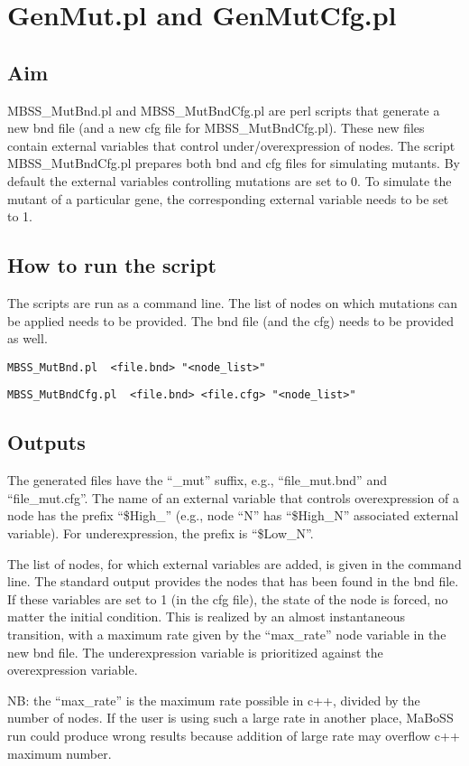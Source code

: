 \documentclass{article}
\begin{document}
\section*{GenMut.pl and GenMutCfg.pl}
\subsection*{Aim}
MBSS\_MutBnd.pl and MBSS\_MutBndCfg.pl are perl scripts that generate a new bnd file (and a new cfg file for MBSS\_MutBndCfg.pl). These new files contain external variables that control under/overexpression of nodes. The script MBSS\_MutBndCfg.pl prepares both bnd and cfg files for simulating mutants. By default the external variables controlling mutations are set to 0. To simulate the mutant of a particular gene, the corresponding external variable needs to be set to 1. 

\subsection*{How to run the script}
The scripts are run as a command line. The list of nodes on which mutations can be applied needs to be provided. The bnd file (and the cfg) needs to be provided as well.

\begin{verbatim}
MBSS_MutBnd.pl  <file.bnd> "<node_list>"
\end{verbatim}

\begin{verbatim}
MBSS_MutBndCfg.pl  <file.bnd> <file.cfg> "<node_list>"
\end{verbatim}

\subsection*{Outputs}

The generated files have the ``\_mut'' suffix, e.g., ``file\_mut.bnd'' and ``file\_mut.cfg''. The name of an external variable that controls overexpression of a node has the prefix ``\$High\_'' (e.g., node ``N'' has ``\$High\_N'' associated external variable). For underexpression, the prefix is ``\$Low\_N''. 

The list of nodes, for which external variables are added, is given in the command line. The standard output provides the nodes that has been found in the bnd file. If these variables are set to 1 (in the cfg file), the state of the node is forced, no matter the initial condition. This is realized by an almost instantaneous transition, with a maximum rate given by the ``max\_rate'' node variable in the new bnd file. The underexpression variable is prioritized against the overexpression variable.

NB: the ``max\_rate'' is the maximum rate possible in c++, divided by the number of nodes. If the user is using such a large rate in another place, MaBoSS run could produce wrong results because addition of large rate may overflow c++ maximum number.
\end{document}
